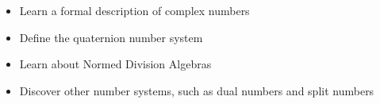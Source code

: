 
\begin{learningobjectives}
{\begin{itemize}
    \item[{\color{OCBurntOrange}\ref{\chabbr:sec:complex}:}] Learn a formal description of complex numbers
    \item[{\color{OCBurntOrange}\ref{\chabbr:sec:quaternions}:}] Define the quaternion number system\\
    \item[{\color{OCBurntOrange}\ref{\chabbr:sec:algebras}:}] Learn about Normed Division Algebras
    \item[{\color{OCBurntOrange}\ref{\chabbr:sec:othernumbers}:}] Discover other number systems, such as dual numbers and split numbers
\end{itemize}}
\end{learningobjectives}





